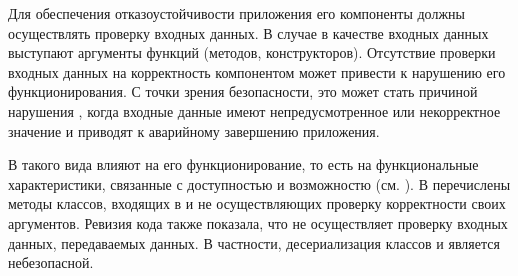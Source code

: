 
%
Для обеспечения отказоустойчивости приложения его компоненты должны осуществлять проверку входных данных. 
%
В случае  в качестве входных данных выступают аргументы функций (методов, конструкторов). 
%
Отсутствие проверки входных данных на корректность компонентом может привести к нарушению его функционирования. 
%
С точки зрения безопасности, это может стать причиной нарушения , когда входные данные имеют непредусмотренное или некорректное значение и приводят к аварийному завершению приложения. 

%
В   такого вида влияют на его функционирование, то есть на функциональные характеристики, связанные с доступностью и возможностю (см. ). 
%
В  перечислены методы классов, входящих в   и не осуществляющих проверку корректности своих аргументов. Ревизия кода также показала, что  не осуществляет проверку входных данных, передаваемых данных. В частности, десериализация классов  и  является небезопасной. 

